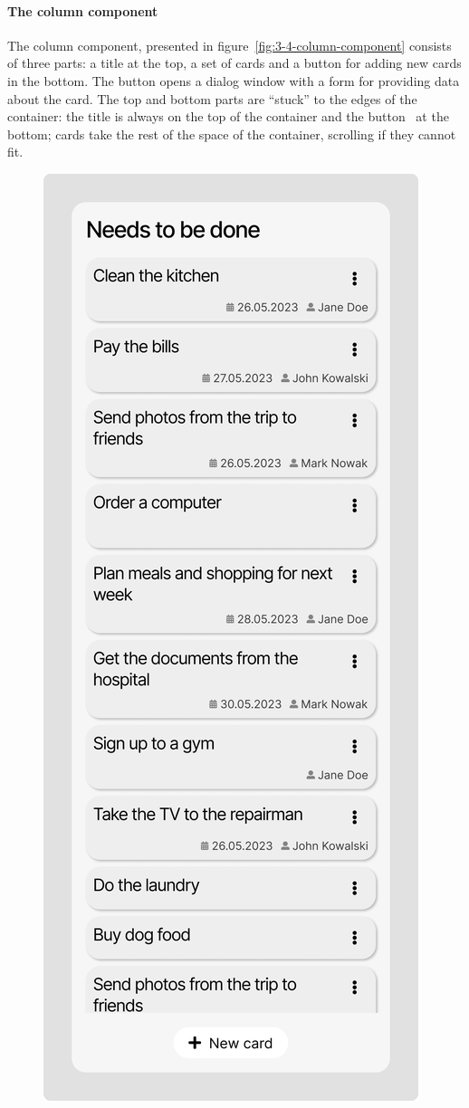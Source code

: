 \paragraph{The column component}
The column component, presented in figure~\ref{fig:3-4-column-component} consists of three parts: a title at the top, a set of cards and a button for adding new cards in the bottom.
The button opens a dialog window with a form for providing data about the card.
The top and bottom parts are \enquote{stuck} to the edges of the container: the title is always on the top of the container and the button \textendash\ at the bottom;
cards take the rest of the space of the container, scrolling if they cannot fit.

\begin{figure}
    \centering
    \includegraphics[height=0.5\textheight]{./3-research-methodology/column-component}

\end{figure}
